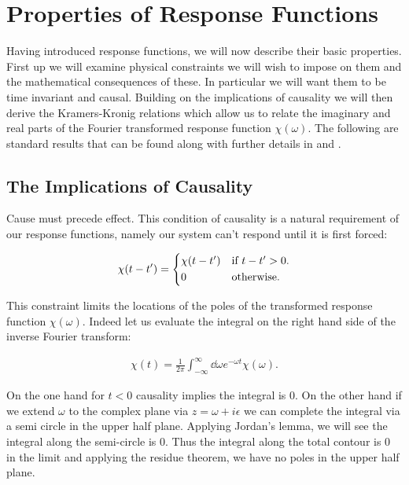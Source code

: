 \section{Properties of Response Functions}

Having introduced response functions, we will now describe their basic properties. First up we will examine physical constraints we will wish to impose on them and the mathematical consequences of these. In particular we will want them to be time invariant and causal. Building on the implications of causality we will then derive the Kramers-Kronig relations which allow us to relate the imaginary and real parts of the Fourier transformed response function $\chi(\omega)$. The following are standard results that can be found along with further details in \cite{LiviPoliti2017} and \cite{Reichl1999}.

\subsection{The Implications of Causality}

Cause must precede effect. This condition of causality is a natural requirement of our response functions, namely our system can't respond until it is first forced:

\begin{align}
\chi(t - t') = 
\begin{cases*}
\chi(t - t') & if $t -t' > 0$.\\
0 & otherwise.
\end{cases*}
\end{align}

\noindent This constraint limits the locations of the poles of the transformed response function $\chi(\omega)$. Indeed let us evaluate the integral on the right hand side of the inverse Fourier transform:

\begin{align}
\chi(t) = \frac{1}{2 \pi} \int_{-\infty}^{\infty} \dd \omega e^{- \omega t} \chi (\omega).
\end{align}

\noindent On the one hand for $t<0$ causality implies the integral is $0$. On the other hand if we extend $\omega$ to the complex plane via $ z = \omega + i \epsilon$ we can complete the integral via a semi circle in the upper half plane. Applying Jordan's lemma, we will see the integral along the semi-circle is $0$. Thus the integral along the total contour is $0$ in the limit and applying the residue theorem, we have no poles in the upper half plane.


